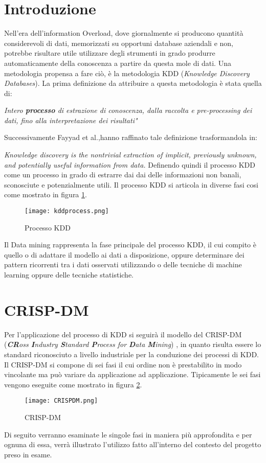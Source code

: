 \section{Introduzione}
Nell'era dell'information Overload, dove giornalmente si producono quantità considerevoli di dati, memorizzati su opportuni database aziendali e non, potrebbe risultare utile utilizzare degli strumenti in grado produrre automaticamente della conoscenza a partire da questa mole di dati. Una metodologia propensa a fare ciò, è la metodologia KDD (\emph{Knowledge Discovery Databases}). 
La prima definizione da attribuire a questa metodologia è stata quella di:

\emph{Intero \textbf{processo} di estrazione di conoscenza, dalla raccolta e pre-processing dei dati, fino alla interpretazione dei risultati"\cite{DBLP:conf/kdd/1995}}


Successivamente Fayyad et al.,hanno raffinato tale definizione trasformandola in: 

\emph{Knowledge discovery is the nontrivial extraction of implicit, previously unknown, and potentially useful information from data.}
\cite{citeulike:1550195} Definendo quindi il processo KDD come un processo in grado di estrarre dai dai delle informazioni non banali, sconosciute e potenzialmente utili. Il processo KDD si articola in diverse fasi cosi come mostrato in figura \ref{kddprocess}.

\begin{figure}[hbtp]
\centering
\texttt{[image: kddprocess.png]}
\caption{Processo KDD}
\label{kddprocess}
\end{figure}

Il Data mining rappresenta la fase principale del processo KDD, il cui compito è quello o di adattare il modello ai dati a disposizione, oppure determinare dei pattern ricorrenti tra i dati osservati utilizzando o delle tecniche di machine learning oppure delle tecniche statistiche. 

\section{CRISP-DM}
Per l’applicazione del processo di KDD si seguirà il modello del CRISP-DM (\emph{\textbf{CR}oss \textbf{I}ndustry \textbf{S}tandard \textbf{P}rocess for \textbf{D}ata \textbf{M}ining})
\cite{wirth2000crisp}
, in quanto risulta essere lo standard riconosciuto a livello industriale per la conduzione dei processi di KDD.
Il CRISP-DM si compone di sei fasi il cui ordine non è prestabilito in modo vincolante ma può variare da applicazione ad applicazione. Tipicamente le sei fasi vengono eseguite come mostrato in figura \ref{CRISPDM}.

\begin{figure}[hbtp]
\centering
\texttt{[image: CRISPDM.png]}
\caption{CRISP-DM}
\label{CRISPDM}
\end{figure}

Di seguito verranno esaminate le singole fasi in maniera più approfondita e per ognuna di essa, verrà illustrato l'utilizzo fatto all'interno del contesto del progetto preso in esame.



